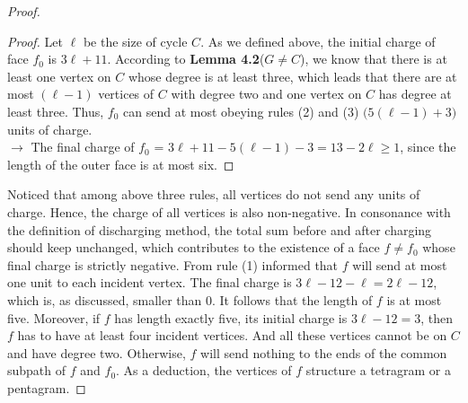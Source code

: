 \begin{proof}
\begin{proof}
Let $\ell$ be the size of cycle $C$. As we defined above, the initial charge of face $f_0$ is $3 \ell + 11$. According to \textbf{Lemma 4.2}($G \ne C$), we know that there is at least one vertex on $C$ whose degree is at least three, which leads that there are at most $(\ell - 1)$ vertices of $C$ with degree two and one vertex on $C$ has degree at least three. Thus, $f_0$ can send at most obeying rules (2) and (3) $\big(5(\ell - 1) + 3\big)$ units of charge.\\
$\longrightarrow$ The final charge of $f_0$ = $3\ell + 11 - 5(\ell - 1) - 3 = 13 - 2\ell \geq 1$, since the length of the outer face is at most six.
\end{proof}
Noticed that among above three rules, all vertices do not send any units of charge. Hence, the charge of all vertices is also non-negative. In consonance with the definition of discharging method, the total sum before and after charging should keep unchanged, which contributes to the existence of a face $f \ne f_0$ whose final charge is strictly negative. From rule (1) informed that $f$ will send at most one unit to each incident vertex. The final charge is $3\ell - 12 - \ell = 2\ell - 12$, which is, as discussed, smaller than 0. It follows that the length of $f$ is at most five. Moreover, if $f$ has length exactly five, its initial charge is $3\ell - 12 = 3$, then $f$ has to have at least four incident vertices. And all these vertices cannot be on $C$ and have degree two. Otherwise, $f$ will send nothing to the ends of the common subpath of $f$ and $f_0$. As a deduction, the vertices of $f$ structure a tetragram or a pentagram.
\end{proof}

